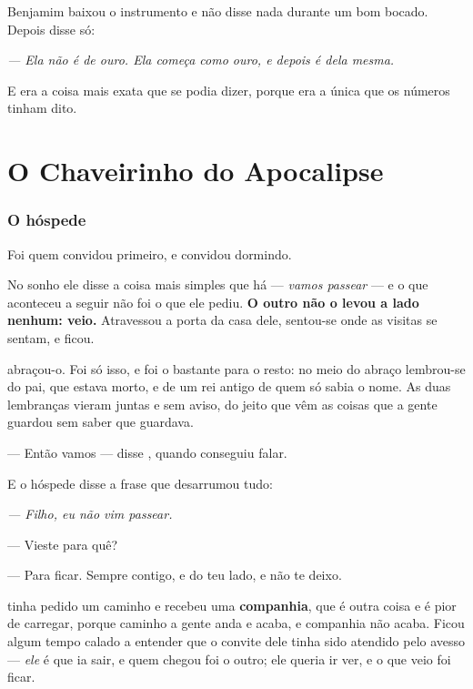 \documentclass[livro.tex]{subfiles}
\begin{document}
\medskip
\noindent Benjamim baixou o instrumento e não disse nada durante um bom bocado.
Depois disse só:

\begin{center}
\emph{--- Ela não é de ouro. Ela começa como ouro, e depois é dela mesma.}
\end{center}

\noindent E era a coisa mais exata que se podia dizer, porque era a única que
os números tinham dito.


\part{O Chaveirinho do Apocalipse}

\section{O hóspede}

Foi \Ben quem convidou primeiro, e convidou dormindo.

No sonho ele disse a coisa mais simples que há --- \emph{vamos passear} --- e o
que aconteceu a seguir não foi o que ele pediu. \textbf{O outro não o levou a
lado nenhum: veio.} Atravessou a porta da casa dele, sentou-se onde as visitas
se sentam, e ficou.

\medskip
\noindent \Ben abraçou-o. Foi só isso, e foi o bastante para o resto: no meio
do abraço lembrou-se do pai, que estava morto, e de um rei antigo de quem só
sabia o nome. As duas lembranças vieram juntas e sem aviso, do jeito que vêm as
coisas que a gente guardou sem saber que guardava.

\medskip
\noindent --- Então vamos --- disse \Ben , quando conseguiu falar.

E o hóspede disse a frase que desarrumou tudo:

\begin{center}
\emph{--- Filho, eu não vim passear.}
\end{center}

\medskip
\noindent --- Vieste para quê?

--- Para ficar. Sempre contigo, e do teu lado, e não te deixo.

\medskip
\noindent \Ben tinha pedido um caminho e recebeu uma \textbf{companhia}, que é
outra coisa e é pior de carregar, porque caminho a gente anda e acaba, e
companhia não acaba. Ficou algum tempo calado a entender que o convite dele
tinha sido atendido pelo avesso --- \emph{ele} é que ia sair, e quem chegou foi
o outro; ele queria ir ver, e o que veio foi ficar.
\end{document}
